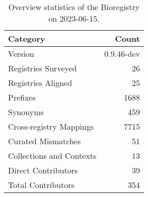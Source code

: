 \begin{table}
\caption{Overview statistics of the Bioregistry on 2023-06-15.}
\label{tab:bioregistry-summary}
\begin{tabular}{lr}
\toprule
Category & Count \\
\midrule
Version & 0.9.46-dev \\
Registries Surveyed & 26 \\
Registries Aligned & 25 \\
Prefixes & 1688 \\
Synonyms & 459 \\
Cross-registry Mappings & 7715 \\
Curated Mismatches & 51 \\
Collections and Contexts & 13 \\
Direct Contributors & 39 \\
Total Contributors & 354 \\
\bottomrule
\end{tabular}
\end{table}

